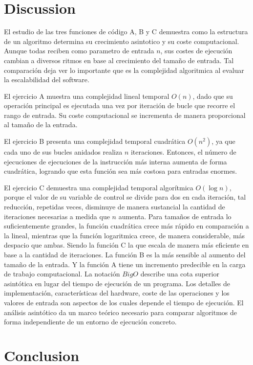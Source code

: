 \documentclass[pdflatex,sn-mathphys-num]{sn-jnl}%
\theoremstyle{thmstyleone}%
\theoremstyle{thmstyletwo}%
\theoremstyle{thmstylethree}%
\begin{document}
\section{Discussion}\label{sec12}

El estudio de las tres funciones de código A, B y C demuestra como la estructura de un algoritmo determina su crecimiento asintotico y su coste computacional. Aunque todas reciben como parametro de entrada \(n\), sus costes de ejecución cambian a diversos ritmos en base al crecimiento del tamaño de entrada. Tal comparación deja ver lo importante que es la complejidad algoritmica al evaluar la escalabilidad del software.

El ejercicio A muestra una complejidad lineal temporal \(O(n)\), dado que su operación principal es ejecutada una vez por iteración de bucle que recorre el rango de entrada. Su coste computacional se incrementa de manera proporcional al tamaño de la entrada.

El ejercicio B presenta una complejidad temporal cuadrática \(O(n^2)\), ya que cada uno de sus bucles anidados realiza \(n\) iteraciones. Entonces, el número de ejecuciones de ejecuciones de la instrucción más interna aumenta de forma cuadrática, logrando que esta función sea más costosa para entradas enormes.

El ejercicio C demuestra una complejidad temporal algorítmica \(O(\log n)\), porque el valor de su variable de control se divide para dos en cada iteración, tal reducción, repetidas veces, disminuye de manera sustancial la cantidad de iteraciones necesarias a medida que \(n\) aumenta.
Para tamaños de entrada lo suficientemente grandes, la función cuadrática crece más rápido en comparación a la lineal, mientras que la función logaritmica crece, de manera considerable, más despacio que ambas. Siendo la función C la que escala de manera más eficiente en base a la cantidad de iteraciones. La función B es la más sensible al aumento del tamaño de la entrada. Y la función A tiene un incremento predecible en la carga de trabajo computacional.
La notación \(Big O\) describe una cota superior asintótica en lugar del tiempo de ejecución de un programa. Los detalles de implementación, características del hardware, coste de las operaciones y los valores de entrada son aspectos de los cuales depende el tiempo de ejecución. El análisis asintótico da un marco teórico necesario para comparar algoritmos de forma independiente de un entorno de ejecución concreto.
\section{Conclusion}\label{sec13}
\end{document}
